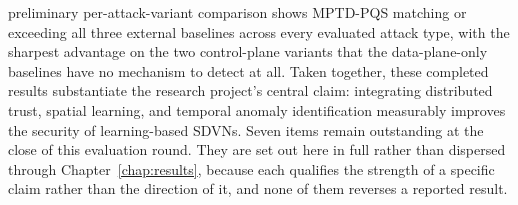 \documentclass[12pt, a4paper]{report}
\begin{document}
preliminary per-attack-variant comparison shows MPTD-PQS matching or
exceeding all three external baselines across every evaluated attack
type, with the sharpest advantage on the two control-plane variants that
the data-plane-only baselines have no mechanism to detect at all. Taken
together, these completed results substantiate the research project's
central claim: integrating distributed trust, spatial learning, and
temporal anomaly identification measurably improves the security of
learning-based SDVNs.
\newline
\newline
Seven items remain outstanding at the close of this evaluation round.
They are set out here in full rather than dispersed through
Chapter~\ref{chap:results}, because each qualifies the strength of a
specific claim rather than the direction of it, and none of them
reverses a reported result.
\end{document}
